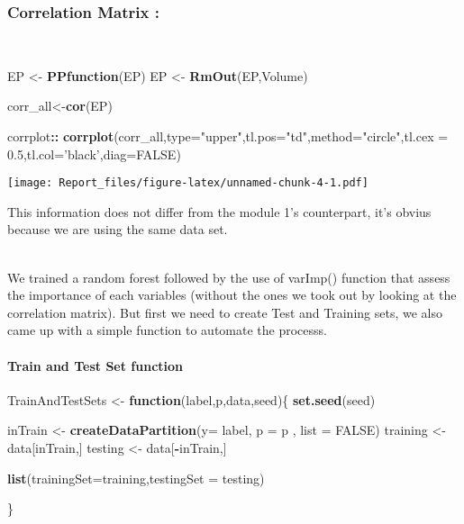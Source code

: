\documentclass[]{article}
\newenvironment{Shaded}{\begin{snugshade}}{\end{snugshade}}
\newcommand{\KeywordTok}[1]{\textcolor[rgb]{0.13,0.29,0.53}{\textbf{#1}}}
\newcommand{\DataTypeTok}[1]{\textcolor[rgb]{0.13,0.29,0.53}{#1}}
\newcommand{\FloatTok}[1]{\textcolor[rgb]{0.00,0.00,0.81}{#1}}
\newcommand{\StringTok}[1]{\textcolor[rgb]{0.31,0.60,0.02}{#1}}
\newcommand{\OtherTok}[1]{\textcolor[rgb]{0.56,0.35,0.01}{#1}}
\newcommand{\ControlFlowTok}[1]{\textcolor[rgb]{0.13,0.29,0.53}{\textbf{#1}}}
\newcommand{\OperatorTok}[1]{\textcolor[rgb]{0.81,0.36,0.00}{\textbf{#1}}}
\newcommand{\NormalTok}[1]{#1}
\let\oldparagraph\paragraph
\renewcommand{\paragraph}[1]{\oldparagraph{#1}\mbox{}}
\begin{document}
\subsubsection{Correlation Matrix :}\label{correlation-matrix}

\\

\begin{Shaded}
\begin{Highlighting}[]
\NormalTok{EP <-}\StringTok{ }\KeywordTok{PPfunction}\NormalTok{(EP)}
\NormalTok{EP <-}\StringTok{ }\KeywordTok{RmOut}\NormalTok{(EP,Volume)}

\NormalTok{corr_all<-}\KeywordTok{cor}\NormalTok{(EP)}



\NormalTok{corrplot}\OperatorTok{::}\StringTok{ }\KeywordTok{corrplot}\NormalTok{(corr_all,}\DataTypeTok{type=}\StringTok{"upper"}\NormalTok{,}\DataTypeTok{tl.pos=}\StringTok{"td"}\NormalTok{,}\DataTypeTok{method=}\StringTok{"circle"}\NormalTok{,}\DataTypeTok{tl.cex =} \FloatTok{0.5}\NormalTok{,}\DataTypeTok{tl.col=}\StringTok{'black'}\NormalTok{,}\DataTypeTok{diag=}\OtherTok{FALSE}\NormalTok{)}
\end{Highlighting}
\end{Shaded}

\texttt{[image: Report\_files/figure-latex/unnamed-chunk-4-1.pdf]}

This information does not differ from the module 1's counterpart, it's
obvius because we are using the same data set.

\\

We trained a random forest followed by the use of varImp() function that
assess the importance of each variables (without the ones we took out by
looking at the correlation matrix). But first we need to create Test and
Training sets, we also came up with a simple function to automate the
processs.

\paragraph{Train and Test Set
function}\label{train-and-test-set-function}

\begin{Shaded}
\begin{Highlighting}[]
\NormalTok{TrainAndTestSets <-}\StringTok{ }\ControlFlowTok{function}\NormalTok{(label,p,data,seed)\{}
  \KeywordTok{set.seed}\NormalTok{(seed)}
  
\NormalTok{  inTrain <-}\StringTok{ }\KeywordTok{createDataPartition}\NormalTok{(}\DataTypeTok{y=}\NormalTok{ label, }\DataTypeTok{p =}\NormalTok{ p , }\DataTypeTok{list =} \OtherTok{FALSE}\NormalTok{)}
\NormalTok{  training <-}\StringTok{ }\NormalTok{data[inTrain,]}
\NormalTok{  testing <-}\StringTok{ }\NormalTok{data[}\OperatorTok{-}\NormalTok{inTrain,]}
  
  
  \KeywordTok{list}\NormalTok{(}\DataTypeTok{trainingSet=}\NormalTok{training,}\DataTypeTok{testingSet =}\NormalTok{ testing)}
  
\NormalTok{\}}
\end{Highlighting}
\end{Shaded}
\end{document}
